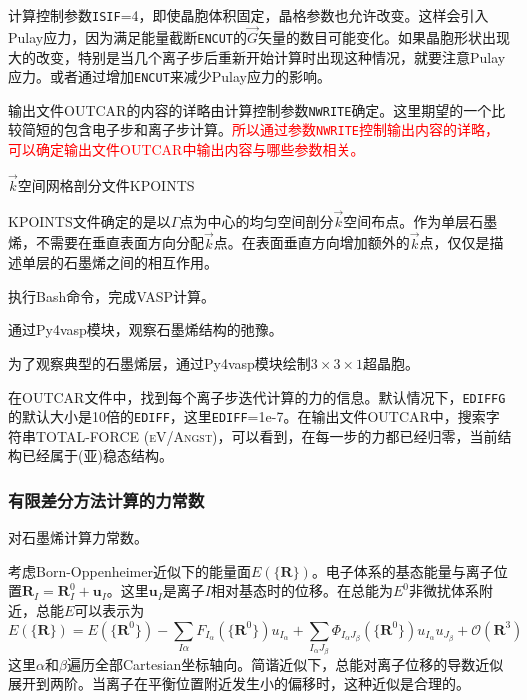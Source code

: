 计算控制参数\texttt{ISIF}=4，即使晶胞体积固定，晶格参数也允许改变。这样会引入\textrm{Pulay}应力，因为满足能量截断\texttt{ENCUT}的$\vec G$矢量的数目可能变化。如果晶胞形状出现大的改变，特别是当几个离子步后重新开始计算时出现这种情况，就要注意\textrm{Pulay}应力。或者通过增加\texttt{ENCUT}来减少\textrm{Pulay}应力的影响。

输出文件\textrm{OUTCAR}的内容的详略由计算控制参数\texttt{NWRITE}确定。这里期望的一个比较简短的包含电子步和离子步计算。\textcolor{red}{所以通过参数\texttt{NWRITE}控制输出内容的详略，可以确定输出文件\textrm{OUTCAR}中输出内容与哪些参数相关。}

$\vec k$空间网格剖分文件\textrm{KPOINTS}

\textrm{KPOINTS}文件确定的是以$\Gamma$点为中心的均匀空间剖分$\vec k$空间布点。作为单层石墨烯，不需要在垂直表面方向分配$\vec k$点。在表面垂直方向增加额外的$\vec k$点，仅仅是描述单层的石墨烯之间的相互作用。

执行\textrm{Bash}命令，完成\textrm{VASP}计算。

通过\textrm{Py4vasp}模块，观察石墨烯结构的弛豫。

为了观察典型的石墨烯层，通过\textrm{Py4vasp}模块绘制$3\times3\times1$超晶胞。

在\textrm{OUTCAR}文件中，找到每个离子步迭代计算的力的信息。默认情况下，\texttt{EDIFFG}的默认大小是10倍的\texttt{EDIFF}，这里\texttt{EDIFF}=\textrm{1e-7}。在输出文件\textrm{OUTCAR}中，搜索字符串\textsc{TOTAL-FORCE (eV/Angst)}，可以看到，在每一步的力都已经归零，当前结构已经属于(亚)稳态结构。

\subsubsection{有限差分方法计算的力常数}
对石墨烯计算力常数。

考虑\textrm{Born-Oppenheimer}近似下的能量面$E(\{\mathbf{R}\})$。电子体系的基态能量与离子位置$\mathbf{R}_I=\mathbf{R}_I^0+\mathbf{u}_I$。这里$\mathbf{u}_I$是离子$I$相对基态时的位移。在总能为$E^0$非微扰体系附近，总能$E$可以表示为
\begin{displaymath}
	E(\{\mathbf{R}\})=E(\{\mathbf{R}^0\})-\sum_{I\alpha}F_{I_{\alpha}}(\{\mathbf{R}^0\})u_{I_{\alpha}}+\sum_{I_{\alpha}J_{\beta}}\Phi_{I_{\alpha}J_{\beta}}(\{\mathbf{R}^0\})u_{I_{\alpha}}u_{J_{\beta}}+\mathcal{O}(\mathbf{R}^3)
\end{displaymath}
这里$\alpha$和$\beta$遍历全部\textrm{Cartesian}坐标轴向。简谐近似下，总能对离子位移的导数近似展开到两阶。当离子在平衡位置附近发生小的偏移时，这种近似是合理的。

